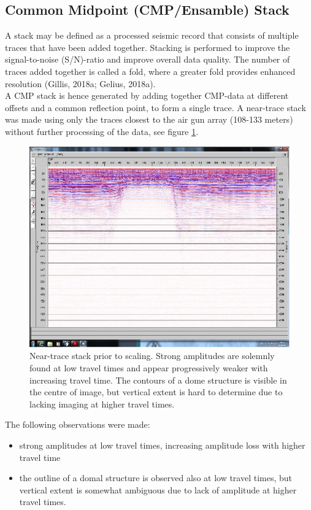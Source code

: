 \documentclass[10pt,a4paper]{article}
\begin{document}
\subsection{Common Midpoint (CMP/Ensamble) Stack}

A stack may be defined as a processed seismic record that consists of multiple traces that have been added together. Stacking is performed to improve the signal-to-noise (S/N)-ratio and improve overall data quality. The number of traces added together is called a fold, where a greater fold provides enhanced resolution (Gillis, 2018a; Gelius, 2018a).
\\
A CMP stack is hence generated by adding together CMP-data at different offsets and a common reflection point, to form a single trace. A near-trace stack was made using only the traces closest to the air gun array (108-133 meters) without further processing of the data, see figure \ref{fig3}.

\begin{figure}[H]
\includegraphics[width=\textwidth, trim={0.3cm 0.8cm 0.2cm 0.5cm},clip]{fig3.jpg}
\caption{Near-trace stack prior to scaling. Strong amplitudes are solemnly found at low travel times and appear progressively weaker with increasing travel time. The contours of a dome structure is visible in the centre of image, but vertical extent is hard to determine due to lacking imaging at higher travel times.}
\label{fig3}
\end{figure}

\noindent The following observations were made:

\begin{itemize}
    \item strong amplitudes at low travel times, increasing amplitude loss with higher travel time
    \item the outline of a domal structure is observed also at low travel times, but vertical extent is somewhat ambiguous due to lack of amplitude at higher travel times.
\end{itemize}
\end{document}
